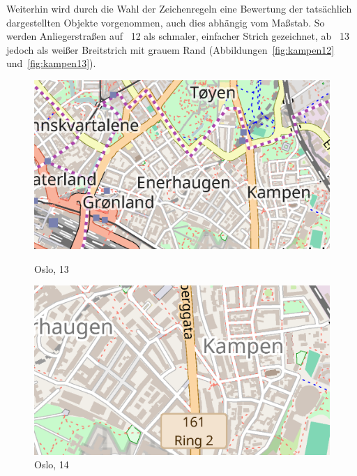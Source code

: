 \documentclass[../main/thesis.tex]{subfiles}
\begin{document}
Weiterhin wird durch die Wahl der Zeichenregeln eine Bewertung der tatsächlich dargestellten Objekte vorgenommen, auch dies abhängig vom Maßstab.
So werden Anliegerstraßen auf ~12 als schmaler, einfacher Strich gezeichnet, ab ~13 jedoch als weißer Breitstrich mit grauem Rand (Abbildungen~\ref{fig:kampen12} und~\ref{fig:kampen13}).




\begin{figure}[ht]
  \begin{minipage}[t]{.5\linewidth}
    \centering
    \includegraphics[width=\ScaleIfNeeded]{../chapter2/kampen-z13}
    \caption{Oslo,  13}\label{fig:kampen13}
  \end{minipage}%
  \begin{minipage}[t]{.5\linewidth}
    \centering
    \includegraphics[width=\ScaleIfNeeded]{../chapter2/kampen-z14}
    \caption{Oslo,  14}\label{fig:kampen14}
  \end{minipage}
\end{figure}
\end{document}
